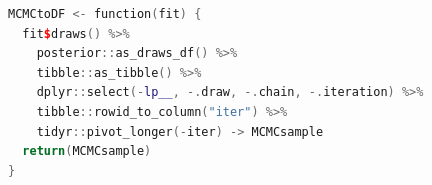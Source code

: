 \begin{lstlisting}[language=C++,label={code:PRE_05MCMC2dfCMDstan},caption={MCMCtoDF関数(cmdstanr版)}]
MCMCtoDF <- function(fit) {
  fit$draws() %>%
    posterior::as_draws_df() %>%
    tibble::as_tibble() %>%
    dplyr::select(-lp__, -.draw, -.chain, -.iteration) %>%
    tibble::rowid_to_column("iter") %>%
    tidyr::pivot_longer(-iter) -> MCMCsample
  return(MCMCsample)
}
\end{lstlisting}
